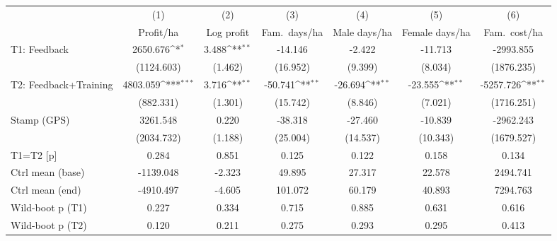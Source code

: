 {
\def\sym#1{\ifmmode^{#1}\else\(^{#1}\)\fi}
\begin{tabular}{l*{6}{c}}
\toprule
                    &\multicolumn{1}{c}{(1)}&\multicolumn{1}{c}{(2)}&\multicolumn{1}{c}{(3)}&\multicolumn{1}{c}{(4)}&\multicolumn{1}{c}{(5)}&\multicolumn{1}{c}{(6)}\\
                    &\multicolumn{1}{c}{Profit/ha}&\multicolumn{1}{c}{Log profit}&\multicolumn{1}{c}{Fam.\ days/ha}&\multicolumn{1}{c}{Male days/ha}&\multicolumn{1}{c}{Female days/ha}&\multicolumn{1}{c}{Fam.\ cost/ha}\\
\midrule
T1: Feedback        &    2650.676\sym{*}  &       3.488\sym{**} &     -14.146         &      -2.422         &     -11.713         &   -2993.855         \\
                    &  (1124.603)         &     (1.462)         &    (16.952)         &     (9.399)         &     (8.034)         &  (1876.235)         \\
T2: Feedback+Training&    4803.059\sym{***}&       3.716\sym{**} &     -50.741\sym{**} &     -26.694\sym{**} &     -23.555\sym{**} &   -5257.726\sym{**} \\
                    &   (882.331)         &     (1.301)         &    (15.742)         &     (8.846)         &     (7.021)         &  (1716.251)         \\
Stamp (GPS)         &    3261.548         &       0.220         &     -38.318         &     -27.460         &     -10.839         &   -2962.243         \\
                    &  (2034.732)         &     (1.188)         &    (25.004)         &    (14.537)         &    (10.343)         &  (1679.527)         \\
\midrule
T1=T2 [p]           &       0.284         &       0.851         &       0.125         &       0.122         &       0.158         &       0.134         \\
Ctrl mean (base)    &   -1139.048         &      -2.323         &      49.895         &      27.317         &      22.578         &    2494.741         \\
Ctrl mean (end)     &   -4910.497         &      -4.605         &     101.072         &      60.179         &      40.893         &    7294.763         \\
Wild-boot p (T1)    &       0.227         &       0.334         &       0.715         &       0.885         &       0.631         &       0.616         \\
Wild-boot p (T2)    &       0.120         &       0.211         &       0.275         &       0.293         &       0.295         &       0.413         \\

\end{tabular}}
